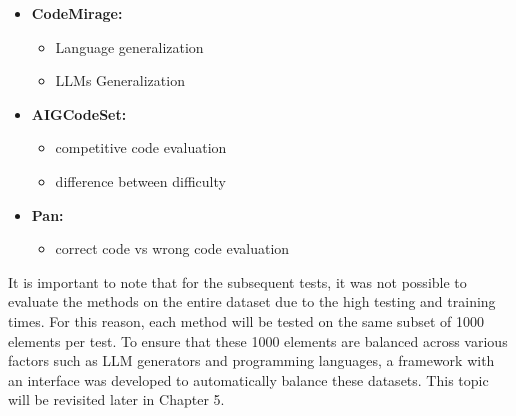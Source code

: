 \begin{itemize}
    \item \textbf{CodeMirage:}
    \begin{itemize}
        \item Language generalization
        \item LLMs Generalization
    \end{itemize}

    \item \textbf{AIGCodeSet:}
    \begin{itemize}
        \item competitive code evaluation
        \item difference between difficulty
    \end{itemize}

    \item \textbf{Pan:}
    \begin{itemize}
        \item correct code vs wrong code evaluation
    \end{itemize}

\end{itemize}

It is important to note that for the subsequent tests, it was not possible 
to evaluate the methods on the entire dataset due to the high testing and 
training times. For this reason, each method will be tested on the same 
subset of 1000 elements per test. To ensure that these 1000 elements are 
balanced across various factors such as LLM generators and programming 
languages, a framework with an interface was developed to automatically 
balance these datasets. This topic will be revisited later in Chapter 5.


